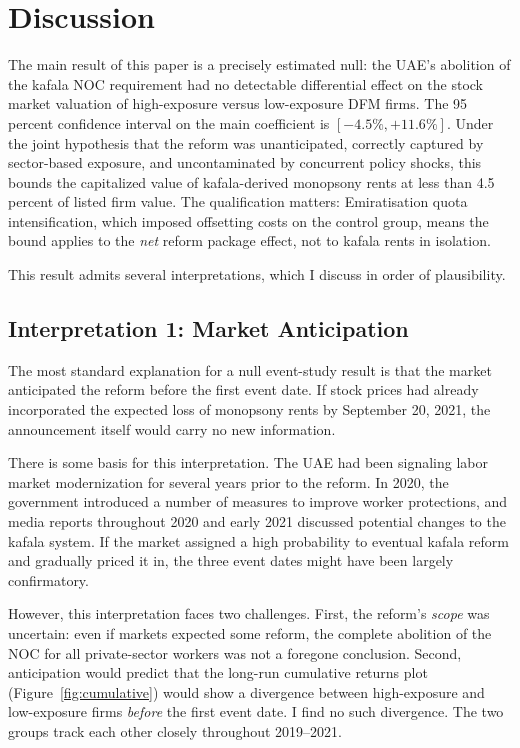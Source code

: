 \documentclass[12pt]{article}
\begin{document}

\section{Discussion}\label{sec:discussion}

The main result of this paper is a precisely estimated null: the UAE's abolition of the kafala NOC requirement had no detectable differential effect on the stock market valuation of high-exposure versus low-exposure DFM firms. The 95 percent confidence interval on the main coefficient is $[-4.5\%, +11.6\%]$. Under the joint hypothesis that the reform was unanticipated, correctly captured by sector-based exposure, and uncontaminated by concurrent policy shocks, this bounds the capitalized value of kafala-derived monopsony rents at less than 4.5 percent of listed firm value. The qualification matters: Emiratisation quota intensification, which imposed offsetting costs on the control group, means the bound applies to the \emph{net} reform package effect, not to kafala rents in isolation.

This result admits several interpretations, which I discuss in order of plausibility.

\subsection{Interpretation 1: Market Anticipation}

The most standard explanation for a null event-study result is that the market anticipated the reform before the first event date. If stock prices had already incorporated the expected loss of monopsony rents by September 20, 2021, the announcement itself would carry no new information.

There is some basis for this interpretation. The UAE had been signaling labor market modernization for several years prior to the reform. In 2020, the government introduced a number of measures to improve worker protections, and media reports throughout 2020 and early 2021 discussed potential changes to the kafala system. If the market assigned a high probability to eventual kafala reform and gradually priced it in, the three event dates might have been largely confirmatory.

However, this interpretation faces two challenges. First, the reform's \emph{scope} was uncertain: even if markets expected some reform, the complete abolition of the NOC for all private-sector workers was not a foregone conclusion. Second, anticipation would predict that the long-run cumulative returns plot (Figure~\ref{fig:cumulative}) would show a divergence between high-exposure and low-exposure firms \emph{before} the first event date. I find no such divergence. The two groups track each other closely throughout 2019--2021.
\end{document}
